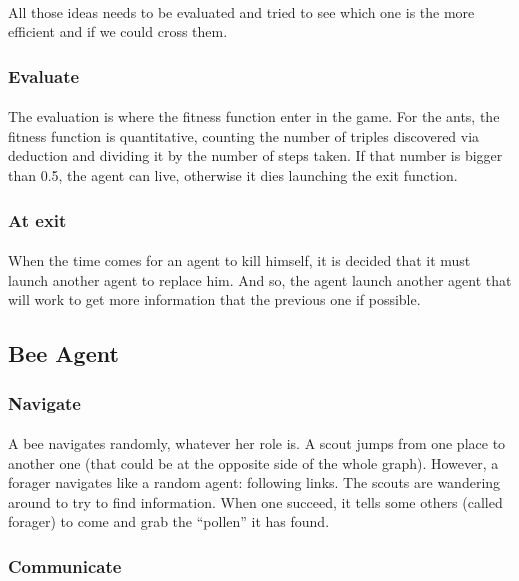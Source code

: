\documentclass{article}
\begin{document}
			\paragraph{}
				All those ideas needs to be evaluated and tried to see which one is the more efficient and if we could cross them.
		\subsubsection{Evaluate}
			\paragraph{}
				The evaluation is where the fitness function enter in the game.
				For the ants, the fitness function is quantitative,
				counting the number of triples discovered via deduction and dividing it by the number of steps taken.
				If that number is bigger than 0.5, the agent can live, otherwise it dies launching the exit function.
		\subsubsection{At exit}
			\paragraph{}
				When the time comes for an agent to kill himself, it is decided that it must launch another agent to replace him.
				And so, the agent launch another agent that will work to get more information that the previous one if possible.
	\subsection{Bee Agent}
		\subsubsection{Navigate}
			\paragraph{}
				A bee navigates randomly, whatever her role is.
				A scout jumps from one place to another one (that could be at the opposite side of the whole graph).
				However, a forager navigates like a random agent: following links.
				The scouts are wandering around to try to find information.
				When one succeed, it tells some others (called forager) to come and grab the ``pollen'' it has found.
		\subsubsection{Communicate}
\end{document}
